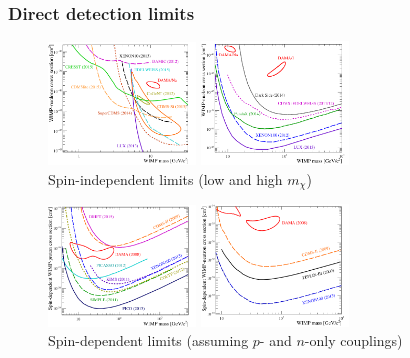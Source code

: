 \subsubsection{Direct detection limits}

\begin{figure}[H]
\begin{center}
  \includegraphics[width=0.35\textwidth]{figs/Limits_LowWIMPmass2015_v04.png}\quad\quad
  \includegraphics[width=0.35\textwidth]{figs/Limits_HighWIMPmass2015_v03.png}\\
  {Spin-independent limits (low and high $m_\chi$)}
\end{center}
\end{figure}

\begin{figure}[H]
\begin{center}
  \includegraphics[width=0.35\textwidth]{figs/Limits_SD_p_vs03.png}\quad\quad
  \includegraphics[width=0.35\textwidth]{figs/Limits_SD_n_vs03.png}\\
  Spin-dependent limits (assuming $p$- and $n$-only couplings)
\end{center}
\end{figure}

